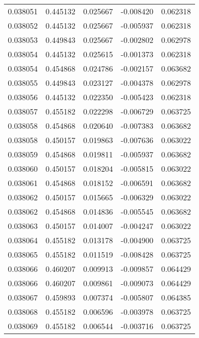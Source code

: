 \begin{tabular}{lrrrr}
0.038051    &  0.445132 &  0.025667 & -0.008420 &             0.062318 \\
0.038052    &  0.445132 &  0.025667 & -0.005937 &             0.062318 \\
0.038053    &  0.449843 &  0.025667 & -0.002802 &             0.062978 \\
0.038054    &  0.445132 &  0.025615 & -0.001373 &             0.062318 \\
0.038054    &  0.454868 &  0.024786 & -0.002157 &             0.063682 \\
0.038055    &  0.449843 &  0.023127 & -0.004378 &             0.062978 \\
0.038056    &  0.445132 &  0.022350 & -0.005423 &             0.062318 \\
0.038057    &  0.455182 &  0.022298 & -0.006729 &             0.063725 \\
0.038058    &  0.454868 &  0.020640 & -0.007383 &             0.063682 \\
0.038058    &  0.450157 &  0.019863 & -0.007636 &             0.063022 \\
0.038059    &  0.454868 &  0.019811 & -0.005937 &             0.063682 \\
0.038060    &  0.450157 &  0.018204 & -0.005815 &             0.063022 \\
0.038061    &  0.454868 &  0.018152 & -0.006591 &             0.063682 \\
0.038062    &  0.450157 &  0.015665 & -0.006329 &             0.063022 \\
0.038062    &  0.454868 &  0.014836 & -0.005545 &             0.063682 \\
0.038063    &  0.450157 &  0.014007 & -0.004247 &             0.063022 \\
0.038064    &  0.455182 &  0.013178 & -0.004900 &             0.063725 \\
0.038065    &  0.455182 &  0.011519 & -0.008428 &             0.063725 \\
0.038066    &  0.460207 &  0.009913 & -0.009857 &             0.064429 \\
0.038066    &  0.460207 &  0.009861 & -0.009073 &             0.064429 \\
0.038067    &  0.459893 &  0.007374 & -0.005807 &             0.064385 \\
0.038068    &  0.455182 &  0.006596 & -0.003978 &             0.063725 \\
0.038069    &  0.455182 &  0.006544 & -0.003716 &             0.063725 \\

\end{tabular}
